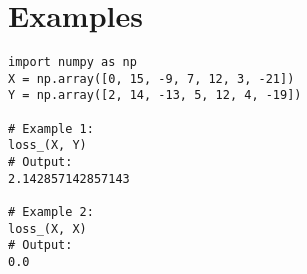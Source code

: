 \section*{Examples}
\begin{verbatim}
import numpy as np
X = np.array([0, 15, -9, 7, 12, 3, -21])
Y = np.array([2, 14, -13, 5, 12, 4, -19])

# Example 1:
loss_(X, Y)
# Output:
2.142857142857143

# Example 2:
loss_(X, X)
# Output:
0.0
\end{verbatim}